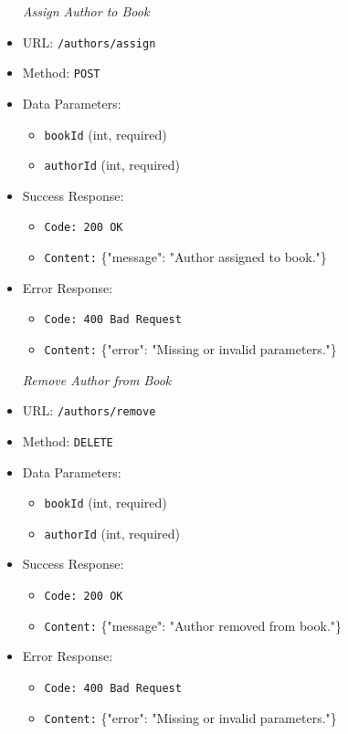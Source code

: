 \begin{itemize}
\item[\textit{Assign Author to Book}] 
\item URL: \texttt{/authors/assign}  
\item Method: \texttt{POST}  
\item Data Parameters:
\begin{itemize}
  \item \texttt{bookId} (int, required)
  \item \texttt{authorId} (int, required)
\end{itemize}
\item Success Response:
\begin{itemize}
  \item \texttt{Code: 200 OK}  
  \item \texttt{Content:} \{"message": "Author assigned to book."\}
\end{itemize}
\item Error Response:
\begin{itemize}
  \item \texttt{Code: 400 Bad Request}  
  \item \texttt{Content:} \{"error": "Missing or invalid parameters."\}
\end{itemize}

\item[\textit{Remove Author from Book}] 
\item URL: \texttt{/authors/remove}  
\item Method: \texttt{DELETE}  
\item Data Parameters:
\begin{itemize}
  \item \texttt{bookId} (int, required)
  \item \texttt{authorId} (int, required)
\end{itemize}
\item Success Response:
\begin{itemize}
  \item \texttt{Code: 200 OK}  
  \item \texttt{Content:} \{"message": "Author removed from book."\}
\end{itemize}
\item Error Response:
\begin{itemize}
  \item \texttt{Code: 400 Bad Request}  
  \item \texttt{Content:} \{"error": "Missing or invalid parameters."\}
\end{itemize}



\end{itemize}
